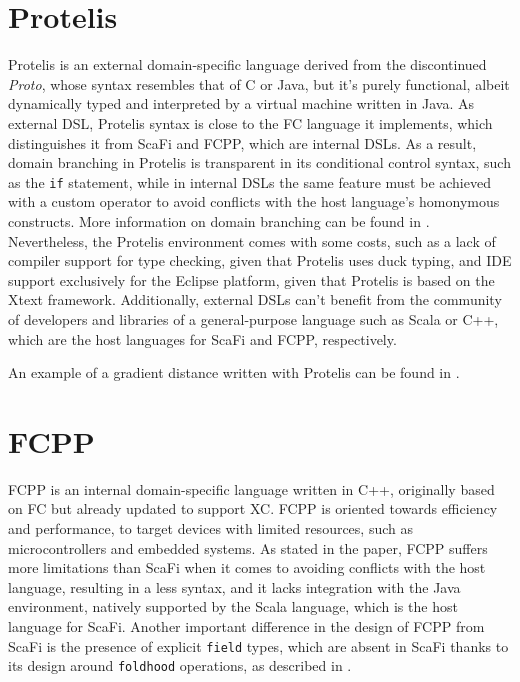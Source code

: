 \section{Protelis}

Protelis is an external domain-specific language derived from the discontinued \textit{Proto}, whose syntax resembles that of C or Java, but it's purely functional, albeit dynamically typed and interpreted by a virtual machine written in Java\cite{protelis}.
%
As external \ac{DSL}, Protelis syntax is close to the \ac{FC} language it implements, which distinguishes it from ScaFi and FCPP, which are internal \acp{DSL}.
%
As a result, domain branching in Protelis is transparent in its conditional control syntax, such as the \texttt{if} statement, while in internal \acp{DSL} the same feature must be achieved with a custom operator to avoid conflicts with the host language's homonymous constructs.
%
More information on domain branching can be found in .
%
Nevertheless, the Protelis environment comes with some costs, such as a lack of compiler support for type checking, given that Protelis uses duck typing, and IDE support exclusively for the Eclipse platform, given that Protelis is based on the Xtext framework\cite{xtext}.
%
Additionally, external \acp{DSL} can't benefit from the community of developers and libraries of a general-purpose language such as Scala or C++, which are the host languages for ScaFi and FCPP, respectively.

An example of a gradient distance written with Protelis can be found in .



\section{FCPP}

FCPP is an internal domain-specific language written in C++, originally based on \ac{FC} but already updated to support \ac{XC}\cite{xc}.
%
FCPP is oriented towards efficiency and performance, to target devices with limited resources, such as microcontrollers and embedded systems\cite{fcpp}.
%
As stated in the paper, FCPP suffers more limitations than ScaFi when it comes to avoiding conflicts with the host language, resulting in a less  syntax, and it lacks integration with the Java environment, natively supported by the Scala language, which is the host language for ScaFi\cite{fcpp}.
%
Another important difference in the design of FCPP from ScaFi is the presence of explicit \texttt{field} types, which are absent in ScaFi thanks to its design around \texttt{foldhood} operations, as described in .

